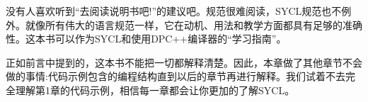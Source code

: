 没有人喜欢听到“去阅读说明书吧!”的建议吧。规范很难阅读，SYCL规范也不例外。就像所有伟大的语言规范一样，它在动机、用法和教学方面都具有足够的准确性。这本书可以作为SYCL和使用DPC++编译器的“学习指南”。\par

正如前言中提到的，这本书不能把一切都解释清楚。因此，本章做了其他章节不会做的事情:代码示例包含的编程结构直到以后的章节再进行解释。我们试着不去完全理解第1章的代码示例，相信每一章都会让你更加的了解SYCL。\par







